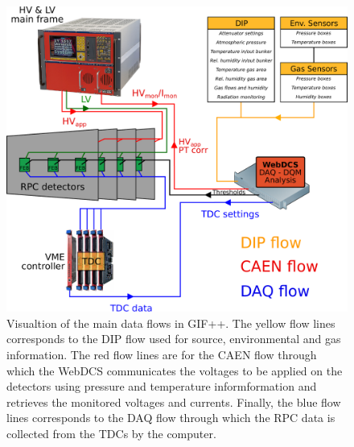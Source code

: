 	\begin{figure}[H]
        \centering
		\includegraphics[width = \plotwidth]{fig/chapt5/GIFpp-setup.pdf}
		\caption{\label{fig:dataflow} Visualtion of the main data flows in GIF++. The yellow flow lines corresponds to the DIP flow used for source, environmental and gas information. The red flow lines are for the CAEN flow through which the WebDCS communicates the voltages to be applied on the detectors using pressure and temperature informformation and retrieves the monitored voltages and currents. Finally, the blue flow lines corresponds to the DAQ flow through which the RPC data is collected from the TDCs by the computer.}
	\end{figure}
	
